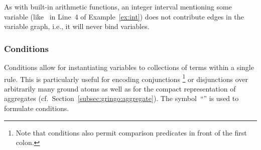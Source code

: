 \begin{newstuff}
As with built-in arithmetic functions,
an integer interval mentioning some variable (like~ in Line~4 of Example~\ref{ex:int})
does not contribute edges in the variable graph, i.e., it will never bind variables.
\end{newstuff}

\subsubsection{Conditions}\label{subsec:gringo:condition}

Conditions allow for instantiating variables to
collections of terms within a single rule.
This is particularly useful for encoding conjunctions%
\footnote{Note that conditions also permit comparison predicates in front of the first colon.}
or disjunctions over
arbitrarily many ground atoms as well as for the compact representation of aggregates
(cf.\ Section~\ref{subsec:gringo:aggregate}).
The symbol~``\code{:}'' is used to formulate conditions.

